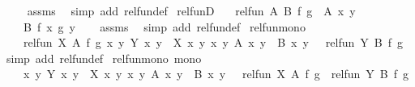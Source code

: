 \begin{isabellebody}
%
\isadelimproof
\ \ %
\endisadelimproof
%
\isatagproof
{}\isamarkupfalse%
\ assms\ \isamarkupfalse%
\ {\isacharparenleft}{\kern0pt}simp\ add{\isacharcolon}{\kern0pt}\ rel{\isacharunderscore}{\kern0pt}fun{\isacharunderscore}{\kern0pt}def{\isacharparenright}{\kern0pt}%
\endisatagproof
{\isafoldproof}%
%
\isadelimproof
\isanewline
%
\endisadelimproof
\isanewline
{}\isamarkupfalse%
\ rel{\isacharunderscore}{\kern0pt}funD{\isacharcolon}{\kern0pt}\isanewline
\ \ \ {\isachardoublequoteopen}rel{\isacharunderscore}{\kern0pt}fun\ A\ B\ f\ g{\isachardoublequoteclose}\ \ {\isachardoublequoteopen}A\ x\ y{\isachardoublequoteclose}\isanewline
\ \ \ {\isachardoublequoteopen}B\ {\isacharparenleft}{\kern0pt}f\ x{\isacharparenright}{\kern0pt}\ {\isacharparenleft}{\kern0pt}g\ y{\isacharparenright}{\kern0pt}{\isachardoublequoteclose}\isanewline
%
\isadelimproof
\ \ %
\endisadelimproof
%
\isatagproof
{}\isamarkupfalse%
\ assms\ \isamarkupfalse%
\ {\isacharparenleft}{\kern0pt}simp\ add{\isacharcolon}{\kern0pt}\ rel{\isacharunderscore}{\kern0pt}fun{\isacharunderscore}{\kern0pt}def{\isacharparenright}{\kern0pt}%
\endisatagproof
{\isafoldproof}%
%
\isadelimproof
\isanewline
%
\endisadelimproof
\isanewline
{}\isamarkupfalse%
\ rel{\isacharunderscore}{\kern0pt}fun{\isacharunderscore}{\kern0pt}mono{\isacharcolon}{\kern0pt}\isanewline
\ \ {\isachardoublequoteopen}{\isasymlbrakk}\ rel{\isacharunderscore}{\kern0pt}fun\ X\ A\ f\ g{\isacharsemicolon}{\kern0pt}\ {\isasymAnd}x\ y{\isachardot}{\kern0pt}\ Y\ x\ y\ {\isasymlongrightarrow}\ X\ x\ y{\isacharsemicolon}{\kern0pt}\ {\isasymAnd}x\ y{\isachardot}{\kern0pt}\ A\ x\ y\ {\isasymLongrightarrow}\ B\ x\ y\ {\isasymrbrakk}\ {\isasymLongrightarrow}\ rel{\isacharunderscore}{\kern0pt}fun\ Y\ B\ f\ g{\isachardoublequoteclose}\isanewline
%
\isadelimproof
%
\endisadelimproof
%
\isatagproof
{}\isamarkupfalse%
{\isacharparenleft}{\kern0pt}simp\ add{\isacharcolon}{\kern0pt}\ rel{\isacharunderscore}{\kern0pt}fun{\isacharunderscore}{\kern0pt}def{\isacharparenright}{\kern0pt}%
\endisatagproof
{\isafoldproof}%
%
\isadelimproof
\isanewline
%
\endisadelimproof
\isanewline
{}\isamarkupfalse%
\ rel{\isacharunderscore}{\kern0pt}fun{\isacharunderscore}{\kern0pt}mono{\isacharprime}{\kern0pt}\ {\isacharbrackleft}{\kern0pt}mono{\isacharbrackright}{\kern0pt}{\isacharcolon}{\kern0pt}\isanewline
\ \ {\isachardoublequoteopen}{\isasymlbrakk}\ {\isasymAnd}x\ y{\isachardot}{\kern0pt}\ Y\ x\ y\ {\isasymlongrightarrow}\ X\ x\ y{\isacharsemicolon}{\kern0pt}\ {\isasymAnd}x\ y{\isachardot}{\kern0pt}\ A\ x\ y\ {\isasymlongrightarrow}\ B\ x\ y\ {\isasymrbrakk}\ {\isasymLongrightarrow}\ rel{\isacharunderscore}{\kern0pt}fun\ X\ A\ f\ g\ {\isasymlongrightarrow}\ rel{\isacharunderscore}{\kern0pt}fun\ Y\ B\ f\ g{\isachardoublequoteclose}\isanewline

\end{isabellebody}
